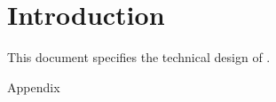 \documentclass[ngerman,		%
					11pt,			%
					openright,	%
					onecolumn,	%
					titlepage,	%
					twoside,		%
					a4paper,		%
					pdftex	]		
					{scrbook}
\begin{document}


\chapter{Introduction}
\label{sec:Introduction}

This document specifies the technical design of \LibName{} \LibVersion{}.











\begin{appendix}	
 {Appendix}
\end{appendix}	
\end{document}
